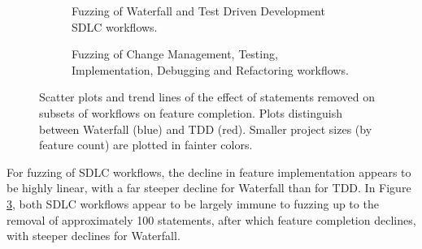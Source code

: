 \documentclass{llncs}
\begin{document}
\begin{figure}
  \centering
  \begin{subfigure}[t]{2.3in}%
    \caption{Fuzzing of Waterfall and Test Driven Development SDLC workflows.}
    \label{fig:fuzzing-features:WT}
  \end{subfigure}
  \hfill
  \begin{subfigure}[t]{2.3in}
    \caption{Fuzzing of Change Management, Testing, Implementation, Debugging and Refactoring workflows.}  
  \label{fig:fuzzing-features:CTIDR}
  \end{subfigure}
  
  \caption{Scatter plots and trend lines of the effect of statements removed on subsets of workflows on feature
    completion. Plots distinguish between Waterfall (blue) and TDD (red).  Smaller project sizes (by feature count) are
    plotted in fainter colors.}
  \label{fig:fuzzing-features}
\end{figure}


For fuzzing of SDLC workflows, the decline in feature implementation appears to be highly linear, with a far steeper
decline for Waterfall than for TDD.  In Figure \ref{fig:fuzzing-features}, both SDLC workflows appear to be largely
immune to fuzzing up to the removal of approximately 100 statements, after which feature completion declines, with
steeper declines for Waterfall.
\end{document}
